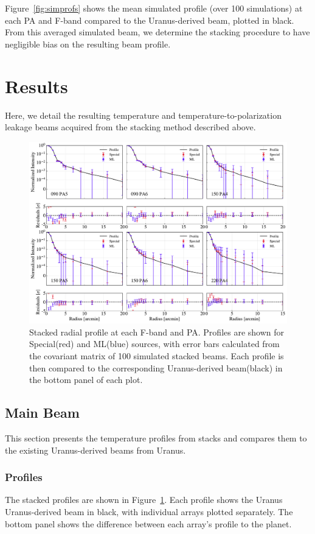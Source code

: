 Figure~\ref{fig:simprofs} shows the mean simulated profile (over 100 simulations) at each PA and F-band compared to the Uranus-derived beam, plotted in black.  From this averaged simulated beam, we determine the stacking procedure to have negligible bias on the resulting beam profile.

\section{Results}
\label{sec:act_results}
Here, we detail the resulting temperature and temperature-to-polarization leakage beams acquired from the stacking method described above. 

\begin{figure}[t]
    \centering
    \includegraphics[width=\textwidth]{Figures/profiles_noP_15.pdf}
    \caption{Stacked radial profile at each F-band and PA.  Profiles are shown for Special(red) and ML(blue) sources, with error bars calculated from the covariant matrix of 100 simulated stacked beams.  Each profile is then compared to the corresponding Uranus-derived beam(black) in the bottom panel of each plot.
    }
    \label{fig:profiles}
\end{figure}

\subsection{Main Beam}
\label{subsec:mainbeam}
This section presents the temperature profiles from stacks and compares them to the existing Uranus-derived beams from Uranus. 

\subsubsection{Profiles}
\label{subsubsec:profiles}
The stacked profiles are shown in Figure~\ref{fig:profiles}.  Each profile shows the Uranus Uranus-derived beam in black, with individual arrays plotted separately.  The bottom panel shows the difference between each array's profile to the planet.

